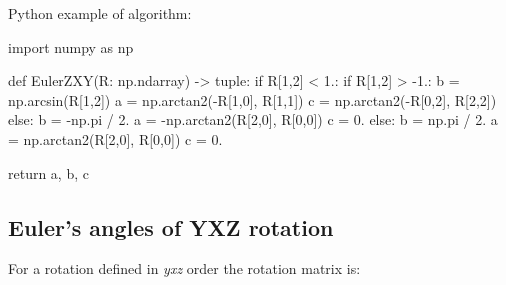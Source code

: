     Python example of algorithm:

\begin{python}
import numpy as np

def EulerZXY(R: np.ndarray) -> tuple:
    if R[1,2] < 1.:
        if R[1,2] > -1.:
            b = np.arcsin(R[1,2])
            a = np.arctan2(-R[1,0], R[1,1])
            c = np.arctan2(-R[0,2], R[2,2])
        else:
            b = -np.pi / 2.
            a = -np.arctan2(R[2,0], R[0,0])
            c = 0.
    else:
        b = np.pi / 2.
        a = np.arctan2(R[2,0], R[0,0])
        c = 0.

    return a, b, c
\end{python}

\subsection{Euler's angles of \textbf{YXZ} rotation}

    For a rotation defined in \textit{yxz} order the rotation matrix is:

